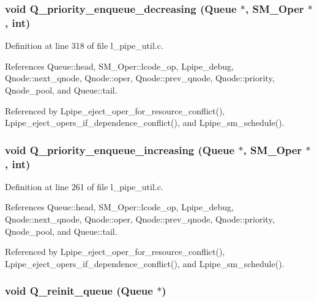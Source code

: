 \subsubsection{\setlength{\rightskip}{0pt plus 5cm}void Q\_\-priority\_\-enqueue\_\-decreasing (\bf{Queue} $\ast$, \bf{SM\_\-Oper} $\ast$, int)}\label{l__pipe__util_8h_e3aff464ee7717b9aa8908499dcd3f5f}




Definition at line 318 of file l\_\-pipe\_\-util.c.

References Queue::head, SM\_\-Oper::lcode\_\-op, Lpipe\_\-debug, Qnode::next\_\-qnode, Qnode::oper, Qnode::prev\_\-qnode, Qnode::priority, Qnode\_\-pool, and Queue::tail.

Referenced by Lpipe\_\-eject\_\-oper\_\-for\_\-resource\_\-conflict(), Lpipe\_\-eject\_\-opers\_\-if\_\-dependence\_\-conflict(), and Lpipe\_\-sm\_\-schedule().
\subsubsection{\setlength{\rightskip}{0pt plus 5cm}void Q\_\-priority\_\-enqueue\_\-increasing (\bf{Queue} $\ast$, \bf{SM\_\-Oper} $\ast$, int)}\label{l__pipe__util_8h_5ae752c73b9349546549ee048228a045}




Definition at line 261 of file l\_\-pipe\_\-util.c.

References Queue::head, SM\_\-Oper::lcode\_\-op, Lpipe\_\-debug, Qnode::next\_\-qnode, Qnode::oper, Qnode::prev\_\-qnode, Qnode::priority, Qnode\_\-pool, and Queue::tail.

Referenced by Lpipe\_\-eject\_\-oper\_\-for\_\-resource\_\-conflict(), Lpipe\_\-eject\_\-opers\_\-if\_\-dependence\_\-conflict(), and Lpipe\_\-sm\_\-schedule().
\subsubsection{\setlength{\rightskip}{0pt plus 5cm}void Q\_\-reinit\_\-queue (\bf{Queue} $\ast$)}\label{l__pipe__util_8h_8a2a321420befe6a29c8ad803115cdc0}




